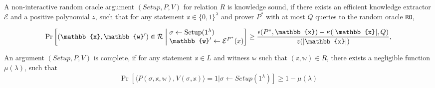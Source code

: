 \begin{definition}
    A non-interactive random oracle argument $(Setup, P, V)$ for relation $R$ is knowledge sound, if there exists an efficient knowledge extractor $\mathcal{E}$ and a positive polynomial $z$, such that for any statement $\mathbb{x}\in\{0,1\}^\lambda$ and prover $P^*$ with at most $Q$ queries to the random oracle \texttt{RO},


    \begin{align*}
        \Pr \left[ (\mathbb{x},\mathbb{w}') \in \mathcal{R} \;\middle|\;
        \begin{array}{@{}l@{}} %
            \sigma \leftarrow \text{Setup}(1^\lambda) \\
            \mathbb{w}' \leftarrow \mathcal{E}^{P^*}(x)
        \end{array}
        \right]
        \geq \frac{\epsilon(P^*, \mathbb{x}) - \kappa(|\mathbb{x}|, Q)}{z(|\mathbb{x}|)},
    \end{align*}
\end{definition}

\begin{definition}[Completeness]
    An argument $(Setup, P, V)$ is complete, if for any statement $\mathbb{x}\in L$ and witness $\mathbb{w}$ such that $(\mathbb{x,w})\in R$, there exists a negligible function $\mu(\lambda)$, such that
    \begin{align*}
        \Pr\left[\langle P(\sigma,\mathbb{x},\mathbb{w}), V(\sigma,\mathbb{x})\rangle=1|\sigma\gets Setup(1^\lambda)\right]\geq 1-\mu(\lambda)
    \end{align*}
\end{definition}

